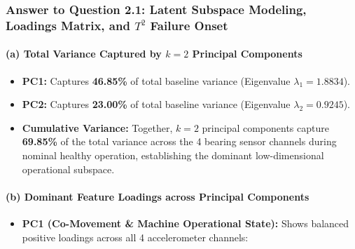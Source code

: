 \begin{tcolorbox}[colback=teal!3!white,colframe=teal!70!black,boxrule=0.7pt,arc=3pt,left=6pt,right=6pt,top=4pt,bottom=4pt,breakable,before upper={\sloppy\raggedright},title=\textbf{\small Notebook Analytical Narrative: Answer to Question 2.1}]
\subsubsection{\texorpdfstring{\textbf{Answer to Question 2.1: Latent Subspace Modeling, Loadings Matrix, and \(T^2\) Failure Onset}}{Answer to Question 2.1: Latent Subspace Modeling, Loadings Matrix, and T\^{}2 Failure Onset}}

\paragraph{\texorpdfstring{\textbf{(a) Total Variance Captured by \(k=2\) Principal Components}}{(a) Total Variance Captured by k=2 Principal Components}}

\begin{itemize}
\tightlist
\item
  \textbf{PC1:} Captures \textbf{46.85\%} of total baseline variance (Eigenvalue \(\lambda_1 = 1.8834\)).
\item
  \textbf{PC2:} Captures \textbf{23.00\%} of total baseline variance (Eigenvalue \(\lambda_2 = 0.9245\)).
\item
  \textbf{Cumulative Variance:} Together, \(k=2\) principal components capture \textbf{69.85\%} of the total variance across the 4 bearing sensor channels during nominal healthy operation, establishing the dominant low-dimensional operational subspace.
\end{itemize}

\paragraph{\texorpdfstring{\textbf{(b) Dominant Feature Loadings across Principal Components}}{(b) Dominant Feature Loadings across Principal Components}}

\begin{itemize}
\tightlist
\item
  \textbf{PC1 (Co-Movement \& Machine Operational State):} Shows balanced positive loadings across all 4 accelerometer channels:


\end{itemize}
\end{tcolorbox}

